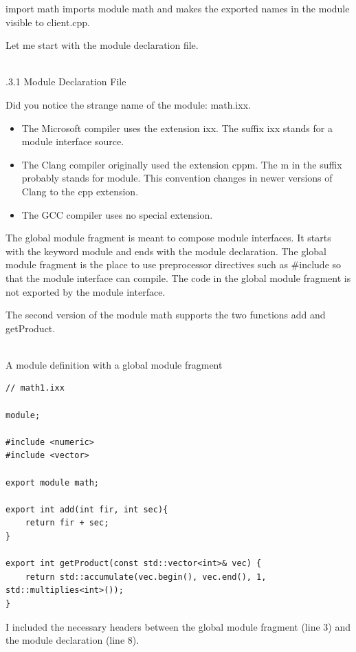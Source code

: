 import math imports module math and makes the exported names in the module visible to client.cpp.

Let me start with the module declaration file.

\hspace*{\fill} \\ %
.3.1\hspace{0.2cm} Module Declaration File

Did you notice the strange name of the module: math.ixx.

\begin{itemize}
\item 
The Microsoft compiler uses the extension ixx. The suffix ixx stands for a module interface source.

\item 
The Clang compiler originally used the extension cppm. The m in the suffix probably stands for module. This convention changes in newer versions of Clang to the cpp extension.

\item 
The GCC compiler uses no special extension.
\end{itemize}

The global module fragment is meant to compose module interfaces. It starts with the keyword module and ends with the module declaration. The global module fragment is the place to use preprocessor directives such as \#include so that the module interface can compile. The code in the global module fragment is not exported by the module interface.

The second version of the module math supports the two functions add and getProduct.

\hspace*{\fill} \\ %
\noindent
A module definition with a global module fragment
\begin{lstlisting}[style=styleCXX]
// math1.ixx

module;

#include <numeric>
#include <vector>

export module math;

export int add(int fir, int sec){
	return fir + sec;
}

export int getProduct(const std::vector<int>& vec) {
	return std::accumulate(vec.begin(), vec.end(), 1, std::multiplies<int>());
}
\end{lstlisting}

I included the necessary headers between the global module fragment (line 3) and the module declaration (line 8).

